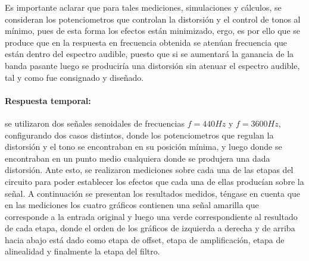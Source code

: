 Es importante aclarar que para tales mediciones, simulaciones y c\'alculos, se consideran los potenciometros que controlan la distorsi\'on y el control de tonos al m\'inimo, pues de esta forma los efectos
est\'an minimizado, ergo, es por ello que se produce que en la respuesta en frecuencia obtenida se aten\'uan frecuencia que est\'an dentro del espectro audible, puesto que si se aumentar\'a la ganancia de la banda pasante luego
se producir\'ia una distorsi\'on sin atenuar el espectro audible, tal y como fue consignado y dise\~nado.

\paragraph*{Respuesta temporal:} se utilizaron dos se\~nales senoidales de frecuencias $f = 440Hz$ y $f = 3600Hz$, configurando dos casos distintos, donde los potenciometros que regulan
la distorsi\'on y el tono se encontraban en su posici\'on m\'inima, y luego donde se encontraban en un punto medio cualquiera donde se produjera una dada distorsi\'on. Ante esto, se realizaron mediciones sobre
cada una de las etapas del circuito para poder establecer los efectos que cada una de ellas produc\'ian sobre la se\~nal. A continuaci\'on se presentan los resultados medidos, t\'engase en cuenta que en las mediciones
los cuatro gr\'aficos contienen una se\~nal amarilla que corresponde a la entrada original y luego una verde correspondiente al resultado de cada etapa, donde el orden de los gr\'aficos de izquierda a derecha y de arriba hacia abajo est\'a dado
como etapa de offset, etapa de amplificaci\'on, etapa de alinealidad y finalmente la etapa del filtro.

